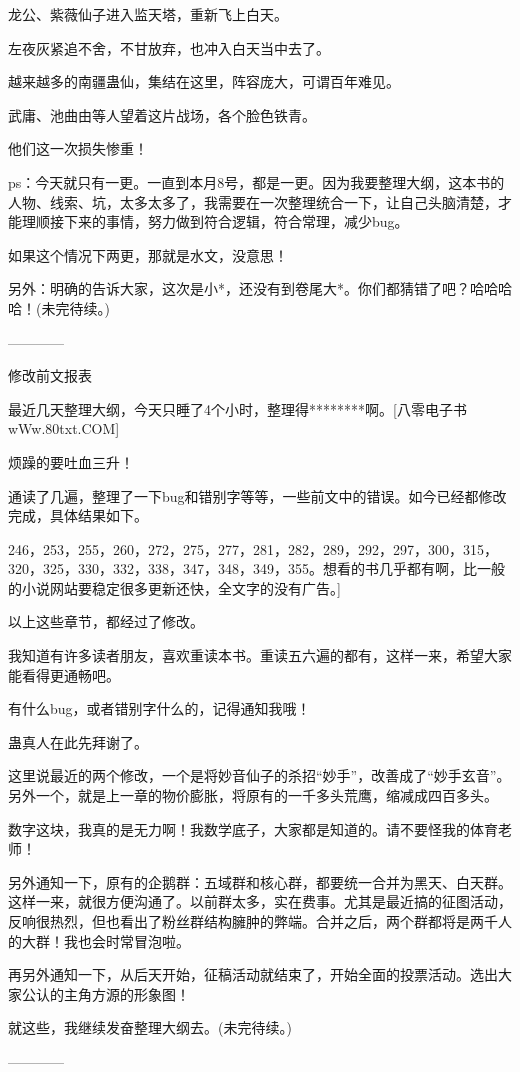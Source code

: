 \begin{this_body}
龙公、紫薇仙子进入监天塔，重新飞上白天。

左夜灰紧追不舍，不甘放弃，也冲入白天当中去了。

越来越多的南疆蛊仙，集结在这里，阵容庞大，可谓百年难见。

武庸、池曲由等人望着这片战场，各个脸色铁青。

他们这一次损失惨重！

ps：今天就只有一更。一直到本月8号，都是一更。因为我要整理大纲，这本书的人物、线索、坑，太多太多了，我需要在一次整理统合一下，让自己头脑清楚，才能理顺接下来的事情，努力做到符合逻辑，符合常理，减少bug。

如果这个情况下两更，那就是水文，没意思！

另外：明确的告诉大家，这次是小*，还没有到卷尾大*。你们都猜错了吧？哈哈哈哈！(未完待续。)

------------

修改前文报表

最近几天整理大纲，今天只睡了4个小时，整理得********啊。[八零电子书wWw.80txt.COM]

烦躁的要吐血三升！

通读了几遍，整理了一下bug和错别字等等，一些前文中的错误。如今已经都修改完成，具体结果如下。

246，253，255，260，272，275，277，281，282，289，292，297，300，315，320，325，330，332，338，347，348，349，355。想看的书几乎都有啊，比一般的小说网站要稳定很多更新还快，全文字的没有广告。]

以上这些章节，都经过了修改。

我知道有许多读者朋友，喜欢重读本书。重读五六遍的都有，这样一来，希望大家能看得更通畅吧。

有什么bug，或者错别字什么的，记得通知我哦！

蛊真人在此先拜谢了。

这里说最近的两个修改，一个是将妙音仙子的杀招“妙手”，改善成了“妙手玄音”。另外一个，就是上一章的物价膨胀，将原有的一千多头荒鹰，缩减成四百多头。

数字这块，我真的是无力啊！我数学底子，大家都是知道的。请不要怪我的体育老师！

另外通知一下，原有的企鹅群：五域群和核心群，都要统一合并为黑天、白天群。这样一来，就很方便沟通了。以前群太多，实在费事。尤其是最近搞的征图活动，反响很热烈，但也看出了粉丝群结构臃肿的弊端。合并之后，两个群都将是两千人的大群！我也会时常冒泡啦。

再另外通知一下，从后天开始，征稿活动就结束了，开始全面的投票活动。选出大家公认的主角方源的形象图！

就这些，我继续发奋整理大纲去。(未完待续。)

------------

\end{this_body}

